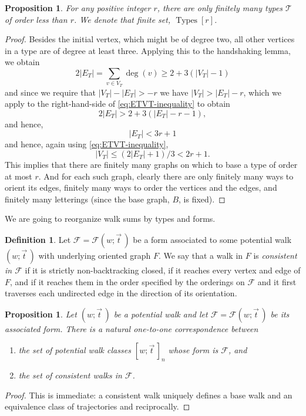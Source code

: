 \documentclass{memo-l}
\theoremstyle{plain}
\theoremstyle{definition}
\numberwithin{section}{chapter}
\numberwithin{equation}{chapter}
\DeclareMathOperator{\Types}{Types}
\newcommand{\potwalk}{(w;\vec t\,)}
\newcommand{\potwalkclass}{[w;\vec t\,]_n}
\theoremstyle{plain}
\newtheorem{prop}[theorem]{Proposition}
\theoremstyle{definition}
\newtheorem{defn}[theorem]{Definition}
\newcommand\cF{\mathcal{F}}
\newcommand\cT{\mathcal{T}}
\begin{document}
\begin{prop} For any positive integer \(r\), there
are only finitely many types \( \cT \) of order less than \(r\). We denote
that finite set, \( \Types[r] \).  \end{prop} \begin{proof} Besides the
initial vertex, which might be of degree two, 
all other vertices in a type are
of degree at least three. 
Applying this to the handshaking lemma, we obtain
\begin{equation}\label{eq:ETVT-inequality} 
2|E_T| = \sum_{v \in V_T} \deg(v) \geq 2 + 3(|V_T|-1) 
\end{equation}
and since we
require that \( |V_T|-|E_T| >-r \) we have
$|V_T|> |E_T|-r$, which we apply to the right-hand-side of 
\eqref{eq:ETVT-inequality} to obtain
$$
2|E_T| > 2 + 3 (|E_T| -r-1),
$$
and hence, 
$$
|E_T| < 3r+1
$$
and hence, again using \eqref{eq:ETVT-inequality}, 
$$
|V_T| \le (2|E_T|+1)/3   < 2r + 1.
$$
This
implies that there are finitely
many graphs on which to base a type of order at most \(r\). 
And for each such graph, clearly there are only finitely many
ways to orient its edges,
finitely many ways to order the vertices and the edges, and
finitely many
letterings (since the base graph, $B$, is fixed).
\end{proof}

We are going to reorganize walk sums by types and forms.

\begin{defn} Let \( \cF = \cF\potwalk \) be a form associated to some
potential walk \( \potwalk \) with underlying oriented graph \( F \). We
say that a walk in \( F \) is \emph{consistent in \( \cF \)} if it is
strictly non-backtracking closed,
if it reaches every vertex and edge of \( F \),
and if it reaches them in the order specified by the orderings on \( \cF
\) and it first traverses each undirected edge in the direction of
its orientation.  \end{defn}

\begin{prop}
\label{pr:one_to_one}
Let \( \potwalk \) be a potential walk and let \( \cF =
\cF\potwalk \) be its associated form. There is a natural one-to-one
correspondence between \begin{enumerate}[label= (\arabic*)] \item the set
of potential walk classes \( \potwalkclass \) whose form is \( \cF \), and
\item the set of consistent walks in \( \cF \).  \end{enumerate} \end{prop}
\begin{proof} This is immediate: a consistent walk uniquely defines a base
walk and an equivalence class of trajectories and reciprocally.
\end{proof}
\end{document}

